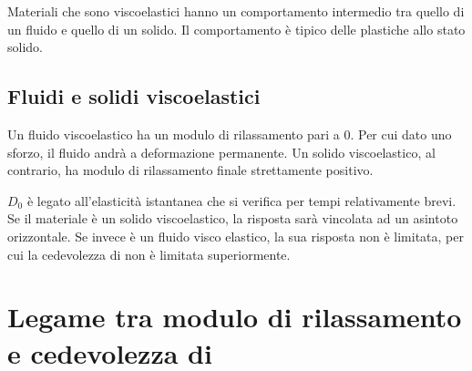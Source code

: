 Materiali che sono viscoelastici hanno un comportamento intermedio tra quello di un fluido e quello di un solido. Il comportamento è tipico delle plastiche allo stato solido.

\section{Fluidi e solidi viscoelastici}
Un fluido viscoelastico ha un modulo di rilassamento pari a 0. Per cui dato uno sforzo, il fluido andrà a deformazione permanente.
Un solido viscoelastico, al contrario, ha modulo di rilassamento finale strettamente positivo.

$D_0$ è legato all'elasticità istantanea che si verifica per tempi relativamente brevi. Se il materiale è un solido viscoelastico, la risposta sarà vincolata ad un asintoto orizzontale.
Se invece è un fluido visco elastico, la sua risposta non è limitata, per cui la cedevolezza di  non è limitata superiormente.

\chapter{Legame tra modulo di rilassamento e cedevolezza di }%
\label{chp:LegameCedevolezzaCreep}
